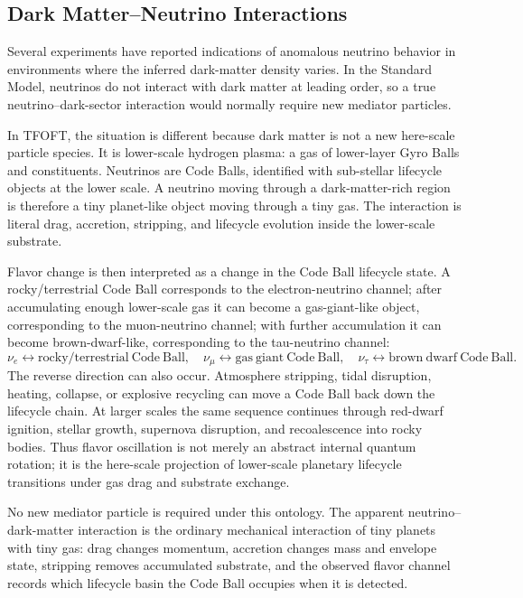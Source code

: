 \documentclass[11pt,a4paper]{article}
\begin{document}
\subsection{Dark Matter--Neutrino Interactions}

Several experiments have reported indications of anomalous neutrino behavior in environments where the inferred dark-matter density varies. In the Standard Model, neutrinos do not interact with dark matter at leading order, so a true neutrino--dark-sector interaction would normally require new mediator particles.

In TFOFT, the situation is different because dark matter is not a new here-scale particle species. It is lower-scale hydrogen plasma: a gas of lower-layer Gyro Balls and constituents. Neutrinos are Code Balls, identified with sub-stellar lifecycle objects at the lower scale. A neutrino moving through a dark-matter-rich region is therefore a tiny planet-like object moving through a tiny gas. The interaction is literal drag, accretion, stripping, and lifecycle evolution inside the lower-scale substrate.

Flavor change is then interpreted as a change in the Code Ball lifecycle state. A rocky/terrestrial Code Ball corresponds to the electron-neutrino channel; after accumulating enough lower-scale gas it can become a gas-giant-like object, corresponding to the muon-neutrino channel; with further accumulation it can become brown-dwarf-like, corresponding to the tau-neutrino channel:
\[
\nu_e \leftrightarrow \mathrm{rocky/terrestrial\ Code\ Ball},
\quad
\nu_\mu \leftrightarrow \mathrm{gas\ giant\ Code\ Ball},
\quad
\nu_\tau \leftrightarrow \mathrm{brown\ dwarf\ Code\ Ball}.
\]
The reverse direction can also occur. Atmosphere stripping, tidal disruption, heating, collapse, or explosive recycling can move a Code Ball back down the lifecycle chain. At larger scales the same sequence continues through red-dwarf ignition, stellar growth, supernova disruption, and recoalescence into rocky bodies. Thus flavor oscillation is not merely an abstract internal quantum rotation; it is the here-scale projection of lower-scale planetary lifecycle transitions under gas drag and substrate exchange.

No new mediator particle is required under this ontology. The apparent neutrino--dark-matter interaction is the ordinary mechanical interaction of tiny planets with tiny gas: drag changes momentum, accretion changes mass and envelope state, stripping removes accumulated substrate, and the observed flavor channel records which lifecycle basin the Code Ball occupies when it is detected.
\end{document}
